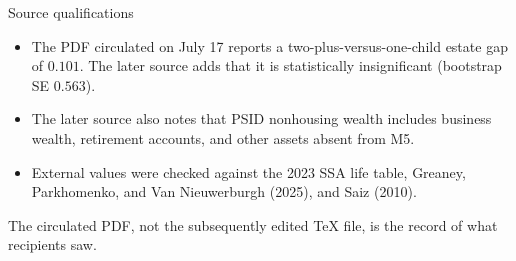 \documentclass[aspectratio=169,11pt]{beamer}
\newcommand{\tightitems}{\setlength{\itemsep}{0.55em}}
\begin{document}
\begin{frame}{Source qualifications}
\small
\begin{itemize}\tightitems
  \item The PDF circulated on July 17 reports a two-plus-versus-one-child estate gap of $0.101$. The later source adds that it is statistically insignificant (bootstrap SE $0.563$).
  \item The later source also notes that PSID nonhousing wealth includes business wealth, retirement accounts, and other assets absent from M5.
  \item External values were checked against the 2023 SSA life table, Greaney, Parkhomenko, and Van Nieuwerburgh (2025), and Saiz (2010).
\end{itemize}

\vspace{0.8em}
The circulated PDF, not the subsequently edited TeX file, is the record of what recipients saw.
\end{frame}
\end{document}
